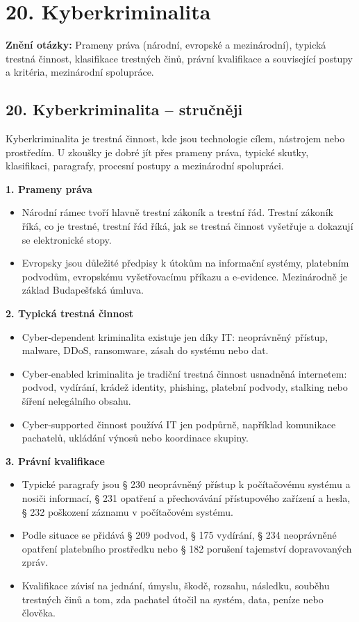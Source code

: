 \documentclass[11pt,a4paper]{article}
\newcommand{\otazka}[3]{\section*{#1}\addcontentsline{toc}{section}{#1}\noindent\textbf{Znění otázky:} #2\par\medskip}
\begin{document}
\newpage

\otazka{20. Kyberkriminalita}{Prameny práva (národní, evropské a mezinárodní), typická trestná činnost, klasifikace trestných činů, právní kvalifikace a související postupy a kritéria, mezinárodní spolupráce.}{BVV03K}

\subsection*{20. Kyberkriminalita -- stručněji}
Kyberkriminalita je trestná činnost, kde jsou technologie cílem, nástrojem nebo prostředím. U zkoušky je dobré jít přes prameny práva, typické skutky, klasifikaci, paragrafy, procesní postupy a mezinárodní spolupráci.

\textbf{1. Prameny práva}
\begin{itemize}
  \item Národní rámec tvoří hlavně trestní zákoník a trestní řád. Trestní zákoník říká, co je trestné, trestní řád říká, jak se trestná činnost vyšetřuje a dokazují se elektronické stopy.
  \item Evropsky jsou důležité předpisy k útokům na informační systémy, platebním podvodům, evropskému vyšetřovacímu příkazu a e-evidence. Mezinárodně je základ Budapešťská úmluva.
\end{itemize}

\textbf{2. Typická trestná činnost}
\begin{itemize}
  \item Cyber-dependent kriminalita existuje jen díky IT: neoprávněný přístup, malware, DDoS, ransomware, zásah do systému nebo dat.
  \item Cyber-enabled kriminalita je tradiční trestná činnost usnadněná internetem: podvod, vydírání, krádež identity, phishing, platební podvody, stalking nebo šíření nelegálního obsahu.
  \item Cyber-supported činnost používá IT jen podpůrně, například komunikace pachatelů, ukládání výnosů nebo koordinace skupiny.
\end{itemize}

\textbf{3. Právní kvalifikace}
\begin{itemize}
  \item Typické paragrafy jsou § 230 neoprávněný přístup k počítačovému systému a nosiči informací, § 231 opatření a přechovávání přístupového zařízení a hesla, § 232 poškození záznamu v počítačovém systému.
  \item Podle situace se přidává § 209 podvod, § 175 vydírání, § 234 neoprávněné opatření platebního prostředku nebo § 182 porušení tajemství dopravovaných zpráv.
  \item Kvalifikace závisí na jednání, úmyslu, škodě, rozsahu, následku, souběhu trestných činů a tom, zda pachatel útočil na systém, data, peníze nebo člověka.
\end{itemize}
\end{document}
